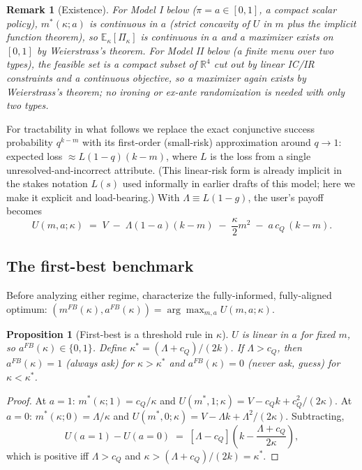 \documentclass[11pt]{article}
\newtheorem{proposition}{Proposition}
\newtheorem{remark}{Remark}
\begin{document}
\begin{remark}[Existence]
For Model I below ($\pi=a\in[0,1]$, a compact scalar policy), $m^*(\kappa;a)$ is
continuous in $a$ (strict concavity of $U$ in $m$ plus the implicit function
theorem), so $\mathbb{E}_\kappa[\Pi_\kappa]$ is continuous in $a$ and a maximizer
exists on $[0,1]$ by Weierstrass's theorem. For Model II below (a finite menu over
two types), the feasible set is a compact subset of $\mathbb{R}^4$ cut out by
linear IC/IR constraints and a continuous objective, so a maximizer again exists
by Weierstrass's theorem; no ironing or ex-ante randomization is needed with only
two types.
\end{remark}

For tractability in what follows we replace the exact conjunctive success
probability $q^{k-m}$ with its first-order (small-risk) approximation around
$q\to 1$: expected loss $\approx L(1-q)(k-m)$, where $L$ is the loss from a single
unresolved-and-incorrect attribute. (This linear-risk form is already implicit in
the stakes notation $L(s)$ used informally in earlier drafts of this model; here we
make it explicit and load-bearing.) With $\Lambda \equiv L(1-g)$, the user's payoff
becomes
\[
U(m,a;\kappa) \;=\; V \;-\; \Lambda(1-a)(k-m) \;-\; \frac{\kappa}{2}m^2 \;-\; a\,c_Q\,(k-m).
\]

\subsection{The first-best benchmark}
\label{sec:firstbest}

Before analyzing either regime, characterize the fully-informed, fully-aligned
optimum: $(m^{FB}(\kappa), a^{FB}(\kappa)) = \arg\max_{m,a} U(m,a;\kappa)$.

\begin{proposition}[First-best is a threshold rule in $\kappa$]\label{prop:firstbest}
$U$ is linear in $a$ for fixed $m$, so $a^{FB}(\kappa) \in \{0,1\}$. Define
$\kappa^* = (\Lambda+c_Q)/(2k)$. If $\Lambda > c_Q$, then $a^{FB}(\kappa)=1$
(always ask) for $\kappa > \kappa^*$ and $a^{FB}(\kappa)=0$ (never ask, guess) for
$\kappa < \kappa^*$.
\end{proposition}

\begin{proof}
At $a=1$: $m^*(\kappa;1)=c_Q/\kappa$ and $U(m^*,1;\kappa)=V-c_Qk+c_Q^2/(2\kappa)$.
At $a=0$: $m^*(\kappa;0)=\Lambda/\kappa$ and
$U(m^*,0;\kappa)=V-\Lambda k+\Lambda^2/(2\kappa)$. Subtracting,
\[
U(a{=}1)-U(a{=}0) \;=\; [\Lambda-c_Q]\left(k - \frac{\Lambda+c_Q}{2\kappa}\right),
\]
which is positive iff $\Lambda>c_Q$ and $\kappa>(\Lambda+c_Q)/(2k)=\kappa^*$.
\end{proof}
\end{document}
